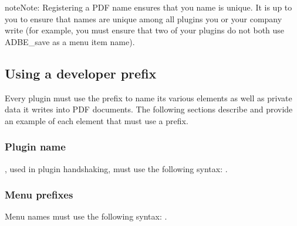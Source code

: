 \documentclass[letterpaper,12pt,english,openany,oneside]{sphinxmanual}
\begin{document}
\begin{sphinxadmonition}{note}{Note:}
Registering a PDF name ensures that you name is unique. It is up to you to ensure that names are unique among all plugins you or your company write (for example, you must ensure that two of your plugins do not both use ADBE\_save as a menu item name).
\end{sphinxadmonition}


\subsection{Using a developer prefix}
\label{\detokenize{Plugins_Pimech:using-a-developer-prefix}}
Every plugin must use the prefix to name its various elements as well as private data it writes into PDF documents. The following sections describe and provide an example of each element that must use a prefix.


\subsubsection{Plugin name}
\label{\detokenize{Plugins_Pimech:plugin-name}}
, used in plugin handshaking, must use the following syntax: .

\begin{sphinxVerbatim}[commandchars=\\\{\}]
  
\end{sphinxVerbatim}


\subsubsection{Menu prefixes}
\label{\detokenize{Plugins_Pimech:menu-prefixes}}
Menu names must use the following syntax: .

\begin{sphinxVerbatim}[commandchars=\\\{\}]
    
\end{sphinxVerbatim}
\end{document}
